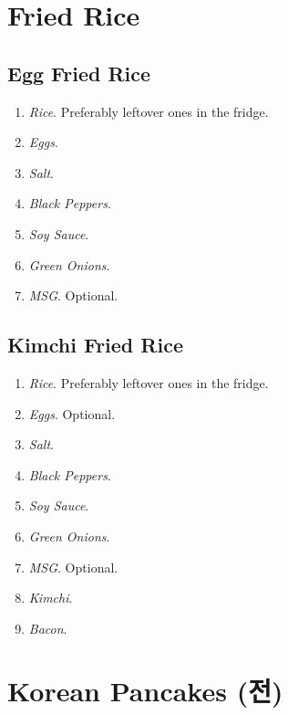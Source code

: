 \documentclass{article}
\begin{document}
\section{Fried Rice} 

  \subsection{Egg Fried Rice} 

    \begin{definition}
      \begin{enumerate}
        \item \textit{Rice}. Preferably leftover ones in the fridge.  
        \item \textit{Eggs}. 
        \item \textit{Salt}. 
        \item \textit{Black Peppers}. 
        \item \textit{Soy Sauce}. 
        \item \textit{Green Onions}. 
        \item \textit{MSG}. Optional. 
      \end{enumerate}
    \end{definition}

  \subsection{Kimchi Fried Rice}

    \begin{definition}
      \begin{enumerate}
        \item \textit{Rice}. Preferably leftover ones in the fridge.  
        \item \textit{Eggs}. Optional. 
        \item \textit{Salt}. 
        \item \textit{Black Peppers}. 
        \item \textit{Soy Sauce}. 
        \item \textit{Green Onions}. 
        \item \textit{MSG}. Optional. 
        \item \textit{Kimchi}. 
        \item \textit{Bacon}. 
      \end{enumerate}
    \end{definition} 

\section{Korean Pancakes (전)} 
\end{document}
